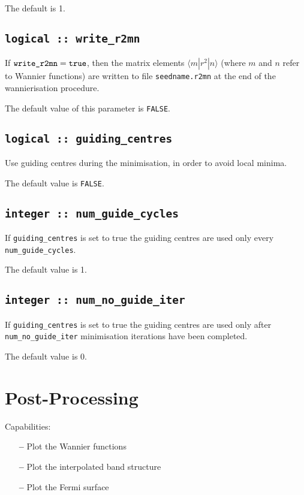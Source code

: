 The default is 1.

\subsection[write\_r2mn]{\tt logical :: write\_r2mn}

If $\verb#write_r2mn#=\verb#true#$, then the matrix elements
$\langle m|r^2|n\rangle$ (where $m$ and $n$ refer to Wannier functions) are written
to file \verb#seedname.r2mn# at the end of the wannierisation procedure.

The default value of this parameter is \verb#FALSE#.


\subsection[guiding\_centres]{\tt logical :: guiding\_centres}
Use guiding centres during the minimisation, in order to avoid
local minima.

The default value is \verb#FALSE#.

\subsection[num\_guide\_cycles]{\tt integer :: num\_guide\_cycles}
If \verb#guiding_centres# is set to true the
guiding centres are used only every \verb#num_guide_cycles#.

The default value is 1.

\subsection[num\_no\_guide\_iter]{\tt integer :: num\_no\_guide\_iter}
If \verb#guiding_centres# is set to true the
guiding centres are used only after \verb#num_no_guide_iter#
minimisation iterations have been completed.

The default value is 0.


\section{Post-Processing}

 Capabilities:

\begin{itemize}
\item[{\bf --}]  Plot the Wannier functions
\item[{\bf --}]  Plot the interpolated band structure 		     
\item[{\bf --}]  Plot the Fermi surface 			     
\end{itemize}


